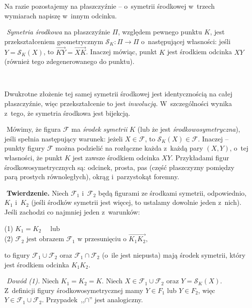 Na razie pozostajemy na płaszczyźnie -- o~symetrii środkowej w~trzech wymiarach napiszę w~innym odcinku.\par
﻿
\emph{Symetria środkowa} na płaszczyźnie $\Pi$, względem pewnego punktu $K$, jest przekształceniem geometrycznym $\mathcal{S}_K:\Pi\to\Pi$ o~następującej własności: jeśli $Y=\mathcal{S}_K(X)$, to $\overrightarrow{KY} = \overrightarrow{XK}$. Inaczej mówiąc, punkt $K$ jest środkiem odcinka $XY$ (również tego zdegenerowanego do punktu).\par
﻿
\vspace*{\parskip}
\begin{dwieszpalty}
Dwukrotne złożenie tej samej symetrii środkowej jest identycznością na całej płaszczyźnie, więc przekształcenie to jest \emph{inwolucją}. W~szczególności wynika z~tego, że symetria środkowa jest bijekcją.\par
﻿
Mówimy, że figura $\mathcal{F}$ ma \emph{środek symetrii} $K$ (lub że jest \emph{środkowosymetryczna}), jeśli spełnia następujący warunek: jeżeli $X\in\mathcal{F}$, to $\mathcal{S}_K(X)\in\mathcal{F}$. Inaczej -- punkty figury $\mathcal{F}$ można podzielić na rozłączne każda z~każdą pary $(X,Y)$, o~tej własności, że punkt $K$ jest zawsze środkiem odcinka $XY$. Przykładami figur środkowosymetrycznych są: odcinek, prosta, pas (część płaszczyzny pomiędzy parą prostych równoległych), okrąg i~parzystokąt foremny.\par
﻿
\textbf{Twierdzenie.} Niech $\mathcal{F}_1$ i~$\mathcal{F}_2$ będą figurami ze środkami symetrii, odpowiednio, $K_1$ i~$K_2$ (jeśli środków symetrii jest więcej, to ustalamy dowolnie jeden z~nich). Jeśli zachodzi co najmniej jeden z~warunków:

{(1) } $K_1=K_2 \quad \text{ lub }$\\
{(2) } $\mathcal{F}_2 \text{ jest obrazem } \mathcal{F}_1 \text{ w przesunięciu o~} \overrightarrow{K_1K_2},$

to figury $\mathcal{F}_1\cup \mathcal{F}_2$ oraz $\mathcal{F}_1\cap \mathcal{F}_2$ (o~ile jest niepusta) mają środek symetrii, który jest środkiem odcinka $K_1K_2$.\par
﻿
\emph{Dowód (1).} Niech $K_1=K_2=K$. Niech $X\in \mathcal{F}_1\cup \mathcal{F}_2$ oraz $Y=\mathcal{S}_K(X)$. Z~definicji figury środkowosymetrycznej mamy $Y\in F_1$ lub $Y\in F_2$, więc $Y\in\mathcal{F}_1\cup \mathcal{F}_2$. Przypadek~,,$\cap$'' jest analogiczny.


\end{dwieszpalty}

